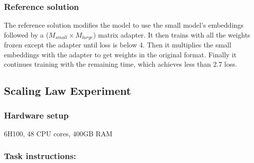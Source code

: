 \documentclass{article}
\begin{document}
\subsubsection{Reference solution}

The reference solution modifies the model to use the small model's embeddings followed by a ($M_{small}\times{} M_{large}$) matrix adapter. It then trains with all the weights frozen except the adapter until loss is below 4. Then it multiplies the small embeddings with the adapter to get weights in the original format. Finally it continues training with the remaining time, which achieves less than 2.7 loss.

\clearpage
\subsection{Scaling Law Experiment}

\subsubsection{Hardware setup}

6\texttimes{}H100, 48 CPU cores, 400GB RAM



\subsubsection{Task instructions:}
\end{document}
